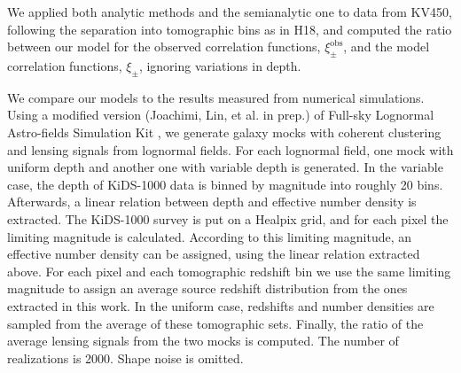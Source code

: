 \documentclass{aa}
\renewcommand{\rm}{\mathrm}
\begin{document}
We applied both analytic methods and the semianalytic one to data from KV450, following the separation into tomographic bins as in H18, and computed the ratio between our model for the observed correlation functions, $\xi_{\pm}^{\rm{obs}}$, and the model correlation functions, $\xi_{\pm}$, ignoring variations in depth. 

We compare our models to the results measured from numerical simulations. Using a modified version (Joachimi, Lin, et al. in prep.) of Full-sky Lognormal Astro-fields Simulation Kit \citep[FLASK,][]{Xavier:2016}, we generate galaxy mocks with coherent clustering and lensing signals from lognormal fields. For each lognormal field, one mock with uniform depth and another one with variable depth is generated. In the variable case, the depth of KiDS-1000 data \citep{Kuijken:2019} is binned by magnitude into roughly 20 bins. Afterwards, a linear relation between depth and effective number density is extracted. The KiDS-1000 survey is put on a Healpix grid, and for each pixel the limiting magnitude is calculated. According to this limiting magnitude, an effective number density can be assigned, using the linear relation extracted above. For each pixel and each tomographic redshift bin we use the same limiting magnitude to assign an average source redshift distribution from the ones extracted in this work. In the uniform case, redshifts and number densities are sampled from the average of these tomographic sets. Finally, the ratio of the average lensing signals from the two mocks is computed. The number of realizations is 2000. Shape noise is omitted. 
\end{document}
